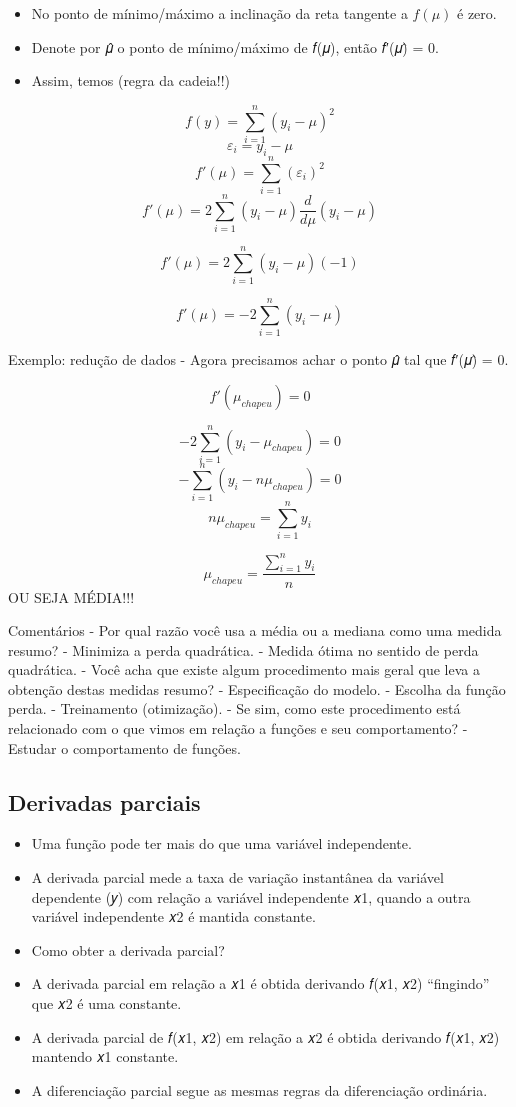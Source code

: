 \documentclass[
]{article}
\providecommand{\tightlist}{%
  \setlength{\itemsep}{0pt}\setlength{\parskip}{0pt}}
\begin{document}
\begin{itemize}
\tightlist
\item
  No ponto de mínimo/máximo a inclinação da reta tangente a \(f(\mu)\) é
  zero.
\item
  Denote por 𝜇̂ o ponto de mínimo/máximo de 𝑓(𝜇), então 𝑓′(𝜇)̂ = 0.
\item
  Assim, temos (regra da cadeia!!)
\end{itemize}

\[ f(y) = \sum_{i=1}^{n} (y_{i} -\mu )^2\]
\[\varepsilon_{i} = y_{i} -\mu\]
\[  f'(\mu) = \sum_{i=1}^{n} (\varepsilon_{i})^2 \]
\[  f'(\mu) = 2 \sum_{i=1}^{n} (y_{i} -\mu) \frac{d}{d \mu} (y_{i} -\mu) \]

\[ f'(\mu) = 2 \sum_{i=1}^{n} (y_{i} -\mu) (-1)\]

\[ f'(\mu) = -2 \sum_{i=1}^{n} (y_{i} -\mu)\]

Exemplo: redução de dados - Agora precisamos achar o ponto 𝜇̂ tal que
𝑓′(𝜇)̂ = 0.

\[ f'(\mu_{chapeu}) = 0\]

\[  -2 \sum_{i=1}^{n} (y_{i} -\mu_{chapeu}) = 0\]
\[  -\sum_{i=1}^{n} (y_{i} -n \mu_{chapeu}) = 0\]
\[ n\mu_{chapeu} = \sum_{i=1}^{n} y_{i}\]

\[ \mu_{chapeu} = \frac{\sum_{i=1}^{n} y_{i}}{n}\] OU SEJA MÉDIA!!!

Comentários - Por qual razão você usa a média ou a mediana como uma
medida resumo? - Minimiza a perda quadrática. - Medida ótima no sentido
de perda quadrática. - Você acha que existe algum procedimento mais
geral que leva a obtenção destas medidas resumo? - Especificação do
modelo. - Escolha da função perda. - Treinamento (otimização). - Se sim,
como este procedimento está relacionado com o que vimos em relação a
funções e seu comportamento? - Estudar o comportamento de funções.

\hypertarget{derivadas-parciais}{%
\subsection{Derivadas parciais}\label{derivadas-parciais}}

\begin{itemize}
\tightlist
\item
  Uma função pode ter mais do que uma variável independente.
\item
  A derivada parcial mede a taxa de variação instantânea da variável
  dependente (𝑦) com relação a variável independente 𝑥1, quando a outra
  variável independente 𝑥2 é mantida constante.
\item
  Como obter a derivada parcial?
\item
  A derivada parcial em relação a 𝑥1 é obtida derivando 𝑓(𝑥1, 𝑥2)
  ``fingindo'' que 𝑥2 é uma constante.
\item
  A derivada parcial de 𝑓(𝑥1, 𝑥2) em relação a 𝑥2 é obtida derivando
  𝑓(𝑥1, 𝑥2) mantendo 𝑥1 constante.
\item
  A diferenciação parcial segue as mesmas regras da diferenciação
  ordinária.
\end{itemize}
\end{document}
